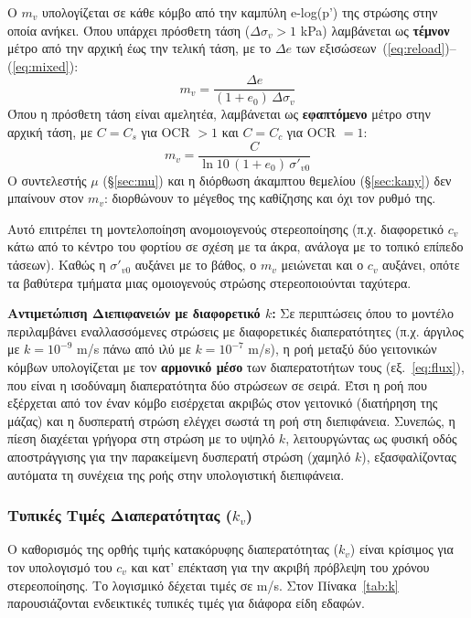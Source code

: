 \documentclass[11pt,a4paper]{article}
\begin{document}
Ο $m_v$ υπολογίζεται σε κάθε κόμβο από την καμπύλη e-log(p') της στρώσης στην οποία ανήκει. Όπου υπάρχει πρόσθετη τάση ($\Delta\sigma_v > 1$ kPa) λαμβάνεται ως \textbf{τέμνον} μέτρο από την αρχική έως την τελική τάση, με το $\Delta e$ των εξισώσεων~(\ref{eq:reload})--(\ref{eq:mixed}):
\begin{equation}
  m_v = \frac{\Delta e}{(1+e_0)\,\Delta\sigma_v}
\end{equation}
Όπου η πρόσθετη τάση είναι αμελητέα, λαμβάνεται ως \textbf{εφαπτόμενο} μέτρο στην αρχική τάση, με $C = C_s$ για OCR $>1$ και $C = C_c$ για OCR $=1$:
\begin{equation}
  m_v = \frac{C}{\ln 10\,(1+e_0)\,\sigma'_{v0}}
\end{equation}
Ο συντελεστής $\mu$ (§\ref{sec:mu}) και η διόρθωση άκαμπτου θεμελίου (§\ref{sec:kany}) δεν μπαίνουν στον $m_v$: διορθώνουν το μέγεθος της καθίζησης και όχι τον ρυθμό της.

Αυτό επιτρέπει τη μοντελοποίηση ανομοιογενούς στερεοποίησης (π.χ. διαφορετικό $c_v$ κάτω από το κέντρο του φορτίου σε σχέση με τα άκρα, ανάλογα με το τοπικό επίπεδο τάσεων). Καθώς η $\sigma'_{v0}$ αυξάνει με το βάθος, ο $m_v$ μειώνεται και ο $c_v$ αυξάνει, οπότε τα βαθύτερα τμήματα μιας ομοιογενούς στρώσης στερεοποιούνται ταχύτερα.

\textbf{Αντιμετώπιση Διεπιφανειών με διαφορετικό $k$:} Σε περιπτώσεις όπου το μοντέλο περιλαμβάνει εναλλασσόμενες στρώσεις με διαφορετικές διαπερατότητες (π.χ. άργιλος με $k = 10^{-9}$ m/s πάνω από ιλύ με $k = 10^{-7}$ m/s), η ροή μεταξύ δύο γειτονικών κόμβων υπολογίζεται με τον \textbf{αρμονικό μέσο} των διαπερατοτήτων τους (εξ.~\ref{eq:flux}), που είναι η ισοδύναμη διαπερατότητα δύο στρώσεων σε σειρά. Έτσι η ροή που εξέρχεται από τον έναν κόμβο εισέρχεται ακριβώς στον γειτονικό (διατήρηση της μάζας) και η δυσπερατή στρώση ελέγχει σωστά τη ροή στη διεπιφάνεια. Συνεπώς, η πίεση διαχέεται γρήγορα στη στρώση με το υψηλό $k$, λειτουργώντας ως φυσική οδός αποστράγγισης για την παρακείμενη δυσπερατή στρώση (χαμηλό $k$), εξασφαλίζοντας αυτόματα τη συνέχεια της ροής στην υπολογιστική διεπιφάνεια.

\subsubsection{Τυπικές Τιμές Διαπερατότητας (\texorpdfstring{$k_v$}{kv})}

Ο καθορισμός της ορθής τιμής κατακόρυφης διαπερατότητας ($k_v$) είναι κρίσιμος για τον υπολογισμό του $c_v$ και κατ' επέκταση για την ακριβή πρόβλεψη του χρόνου στερεοποίησης. Το λογισμικό δέχεται τιμές σε m/s. Στον Πίνακα~\ref{tab:k} παρουσιάζονται ενδεικτικές τυπικές τιμές για διάφορα είδη εδαφών.
\end{document}
